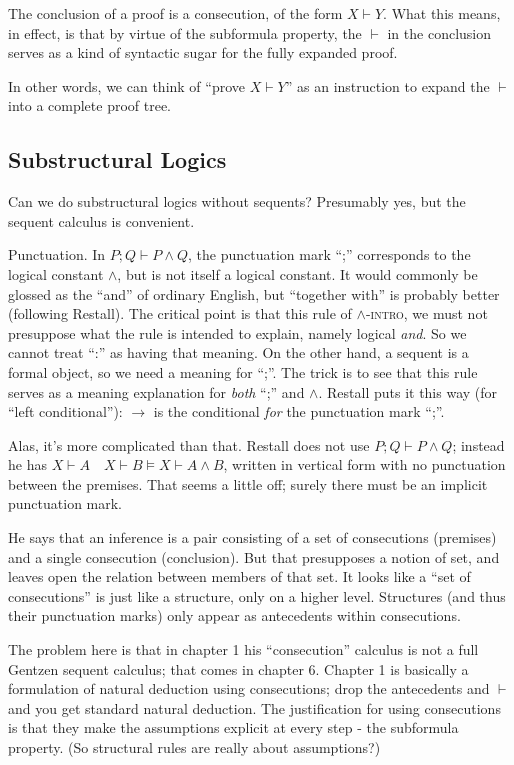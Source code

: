\documentclass{article}
\begin{document}
The conclusion of a proof is a consecution, of the form \(X\vdash Y\).
What this means, in effect, is that by virtue of the subformula
property, the \(\vdash\) in the conclusion serves as a kind of
syntactic sugar for the fully expanded proof.

In other words, we can think of ``prove \(X\vdash Y\)'' as an
instruction to expand the \(\vdash\) into a complete proof tree.

\subsection{Substructural Logics}

\begin{remark}
  Can we do substructural logics without sequents?  Presumably yes,
  but the sequent calculus is convenient.
\end{remark}

\begin{remark}
  Punctuation.  In \(P;Q\vdash P\land Q\), the punctuation mark ``;''
  corresponds to the logical constant \(\land\), but is not itself a
  logical constant.  It would commonly be glossed as the ``and'' of
  ordinary English, but ``together with'' is probably better
  (following Restall).  The critical point is that this rule of
  \(\land\)-\textsc{intro}, we must not presuppose what the rule is
  intended to explain, namely logical \emph{and}.  So we cannot treat
  ``:'' as having that meaning.  On the other hand, a sequent is a
  formal object, so we need a meaning for ``;''.  The trick is to see
  that this rule serves as a meaning explanation for \emph{both} ``;''
  and \(\land\).  Restall puts it this way (for ``left conditional''):
  \(\to\) is the conditional \emph{for} the punctuation mark ``;''.
\end{remark}

\begin{remark}
  Alas, it's more complicated than that.  Restall does not use
  \(P;Q\vdash P\land Q\); instead he has \(X\vdash A\quad X\vdash
  B\models X\vdash A\land B\), written in vertical form with no
  punctuation between the premises.  That seems a little off; surely
  there must be an implicit punctuation mark.

  He says that an inference is a pair consisting of a set of
  consecutions (premises) and a single consecution (conclusion).  But
  that presupposes a notion of set, and leaves open the relation
  between members of that set.  It looks like a ``set of
  consecutions'' is just like a structure, only on a higher level.
  Structures (and thus their punctuation marks) only appear as
  antecedents within consecutions.

  The problem here is that in chapter 1 his ``consecution'' calculus
  is not a full Gentzen sequent calculus; that comes in chapter 6.
  Chapter 1 is basically a formulation of natural deduction using
  consecutions; drop the antecedents and \(\vdash\) and you get
  standard natural deduction.  The justification for using
  consecutions is that they make the assumptions explicit at every
  step - the subformula property.  (So structural rules are really
  about assumptions?)
\end{remark}
\end{document}
